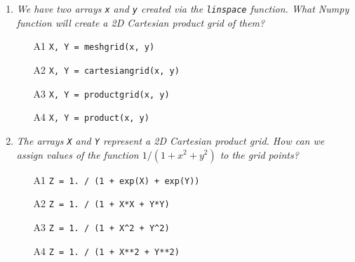 \begin{enumerate}
\begin{enumerate}
\begin{Verbatim}[commandchars=\\\{\}]
\PY{n}{legend}\PY{p}{(}\PY{p}{)}
\PY{n}{lab}\PY{o}{.}\PY{n}{show}\PY{p}{(}\PY{p}{)}
\end{Verbatim}
\item[A4] 
\begin{Verbatim}[commandchars=\\\{\}]
\PY{k+kn}{from} \PY{n+nn}{numpy} \PY{k+kn}{import} \PY{o}{*}
\PY{k+kn}{from} \PY{n+nn}{pylab} \PY{k+kn}{import} \PY{o}{*}
\PY{n}{x} \PY{o}{=} \PY{n}{linspace}\PY{p}{(}\PY{l+m+mi}{0}\PY{p}{,} \PY{n}{pi}\PY{p}{,} \PY{l+m+mi}{100}\PY{p}{)}
\PY{n}{y} \PY{o}{=} \PY{n}{cos}\PY{p}{(}\PY{n}{x}\PY{p}{)}
\PY{n}{axis}\PY{o}{=}\PY{p}{(}\PY{l+s}{"}\PY{l+s}{equal}\PY{l+s}{"}\PY{p}{)}
\PY{n}{clf}\PY{p}{(}\PY{p}{)}
\PY{n}{plot}\PY{p}{(}\PY{n}{x}\PY{p}{,} \PY{n}{y}\PY{p}{,} \PY{l+s}{'}\PY{l+s}{b--}\PY{l+s}{'}\PY{p}{,} \PY{n}{label}\PY{o}{=}\PY{l+s}{"}\PY{l+s}{cos(x)}\PY{l+s}{"}\PY{p}{)}
\PY{n}{legend}\PY{p}{(}\PY{p}{)}
\PY{n}{lab}\PY{o}{.}\PY{n}{show}\PY{p}{(}\PY{p}{)}
\end{Verbatim}
\end{enumerate}

\vspace{6mm}

\item {\em We have two arrays {\tt x} and {\tt y} created via the {\tt linspace} function. What 
Numpy function will create a 2D Cartesian product grid of them?}\\

\begin{enumerate}
\item[A1] {\tt X, Y  = meshgrid(x, y)}
\item[A2] {\tt X, Y  = cartesiangrid(x, y)}
\item[A3] {\tt X, Y  = productgrid(x, y)}
\item[A4] {\tt X, Y  = product(x, y)}
\end{enumerate}

\vspace{6mm}

\item {\em The arrays {\tt X} and {\tt Y} represent a 2D Cartesian product grid. How can we
assign values of the function $1 / (1 + x^2 + y^2)$ to the grid points?}\\

\begin{enumerate}
\item[A1] {\tt Z = 1. / (1 + exp(X) + exp(Y))}
\item[A2] {\tt Z = 1. / (1 + X*X + Y*Y)}
\item[A3] {\tt Z = 1. / (1 + X\^{}2 + Y\^{}2)}
\item[A4] {\tt Z = 1. / (1 + X**2 + Y**2)}
\end{enumerate}


\end{enumerate}
